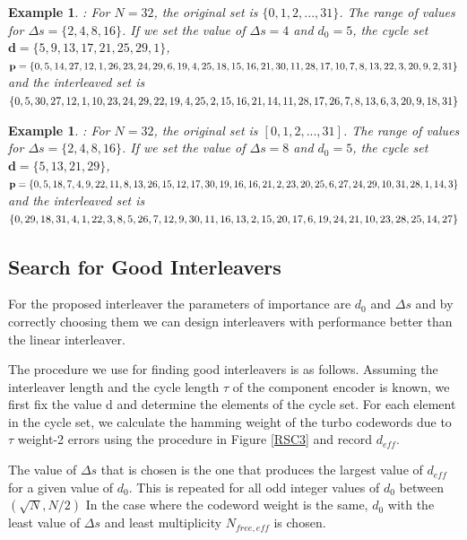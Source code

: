 \documentclass[a4paper, 12pt, oneside, openary]{jbook}
\newtheorem{example}[theorem]{Example}
\begin{document}
 \begin{example}
 \label{E1}
 : For $N=32$, the original set is $\{0,1,2,...,31\}$. The range of values for 
 $\Delta s = \{ 2,4,8,16\}$.  If we set the value
 of $\Delta s = 4$ and $d_0=5$, the cycle set
 $\mathbf{d} = \{ 5,9,13,17,21,25,29,1\}$, \\
 $\mathbf{p}= \{ 0, 5, 14, 27, 12, 1, 26, 23, 24, 29, 6, 19, 4, 25, 18, 15, 16, 21\\,
 30, 11, 28, 17, 10, 7, 8, 13, 22, 3, 20, 9, 2, 31\}$ 
 and the interleaved set is 
$\{0,5,30,27,12,1,10,23,24,29,22,19, 4, 25 ,2, 15\\,16, 21, 14, 11, 28,17,
  26, 7, 8, 13, 6, 3, 20, 9, 18, 31\}$
 \end{example}
 
  \begin{example}
  \label{E2}
 : For $N=32$, the original set is $[0,1,2,...,31]$. The range of values for 
 $\Delta s = \{ 2,4,8,16\}$.  If we set the value
 of $\Delta s = 8$ and $d_0=5$, the cycle set 
  $\mathbf{d}=\{ 5,13,21,29\}$, \\
 $\mathbf{p}= \{ 0, 5, 18, 7, 4, 9, 22, 11, 8, 13, 26, 15, 12, 17, 30, 19, 16, 16, 21\\,
 2, 23, 20, 25, 6, 27, 24, 29, 10, 31, 28, 1, 14, 3\}$  and the interleaved set is 
  $\{0, 29, 18, 31, 4, 1, 22, 3, 8, 5, 26, 7, 12, 9, 30\\, 11, 16, 13, 2,
  15, 20, 17, 6, 19, 24, 21, 10, 23, 28,25, 14, 27\}$
 
 \end{example}
 \subsection{Search for Good Interleavers}\label{secdec}
  For the proposed interleaver the parameters of importance are $d_0$ and $\Delta s$ and
 by correctly choosing them we can design interleavers with performance better
 than the linear interleaver. 

 The procedure we use for finding good interleavers is as follows. Assuming
 the interleaver length and the cycle length $\tau$ of the component 
 encoder is known, we first fix the value d and determine the elements of the cycle set.
 For each element in the cycle set, we calculate the hamming weight of the 
 turbo codewords 
 due to $\tau$ weight-2 errors
 using the procedure in Figure \ref{RSC3} and record $d_{eff}$. 

 
 The value of 
 $\Delta s$ that is chosen is the one that produces the largest value of $d_{eff}$
 for a given value of $d_0$. This is repeated for all odd integer values of $d_0$
  between $(\sqrt{N},N/2)$
  In the case where the codeword weight is the same, 
 $d_0$ with the least value of $\Delta s$ and least multiplicity $N_{free,eff}$ is chosen.
   
\end{document}
